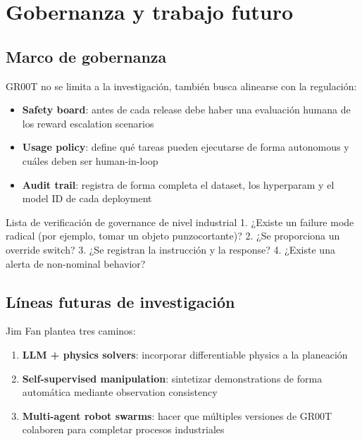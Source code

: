\documentclass[a4paper]{article}
\begin{document}
\newpage

\section{Gobernanza y trabajo futuro}

\subsection{Marco de gobernanza}

GR00T no se limita a la investigación, también busca alinearse con la regulación:

\begin{itemize}
    \item \textbf{Safety board}: antes de cada release debe haber una evaluación humana de los reward escalation scenarios
    \item \textbf{Usage policy}: define qué tareas pueden ejecutarse de forma autonomous y cuáles deben ser human-in-loop
    \item \textbf{Audit trail}: registra de forma completa el dataset, los hyperparam y el model ID de cada deployment
\end{itemize}

\begin{importantbox}{Lista de verificación de governance de nivel industrial}
1. ¿Existe un failure mode radical (por ejemplo, tomar un objeto punzocortante)? 2. ¿Se proporciona un override switch? 3. ¿Se registran la instrucción y la response? 4. ¿Existe una alerta de non-nominal behavior?
\end{importantbox}

\subsection{Líneas futuras de investigación}

Jim Fan plantea tres caminos:

\begin{enumerate}
    \item \textbf{LLM + physics solvers}: incorporar differentiable physics a la planeación
    \item \textbf{Self-supervised manipulation}: sintetizar demonstrations de forma automática mediante observation consistency
    \item \textbf{Multi-agent robot swarms}: hacer que múltiples versiones de GR00T colaboren para completar procesos industriales
\end{enumerate}
\end{document}
